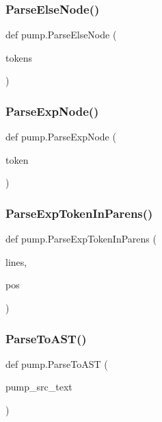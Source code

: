 \subsubsection{\texorpdfstring{ParseElseNode()}{ParseElseNode()}}
{\footnotesize\ttfamily def pump.\+Parse\+Else\+Node (\begin{DoxyParamCaption}\item[{}]{tokens }\end{DoxyParamCaption})}

\mbox{\label{namespacepump_af62b08489d90e69d0577e82c98383ba7}} 
\subsubsection{\texorpdfstring{ParseExpNode()}{ParseExpNode()}}
{\footnotesize\ttfamily def pump.\+Parse\+Exp\+Node (\begin{DoxyParamCaption}\item[{}]{token }\end{DoxyParamCaption})}

\mbox{\label{namespacepump_ae094486db14ecec9347129c5f230042d}} 
\subsubsection{\texorpdfstring{ParseExpTokenInParens()}{ParseExpTokenInParens()}}
{\footnotesize\ttfamily def pump.\+Parse\+Exp\+Token\+In\+Parens (\begin{DoxyParamCaption}\item[{}]{lines,  }\item[{}]{pos }\end{DoxyParamCaption})}

\mbox{\label{namespacepump_a56ac10a83a3a875d305c9aae71fc0549}} 
\subsubsection{\texorpdfstring{ParseToAST()}{ParseToAST()}}
{\footnotesize\ttfamily def pump.\+Parse\+To\+A\+ST (\begin{DoxyParamCaption}\item[{}]{pump\+\_\+src\+\_\+text }\end{DoxyParamCaption})}

